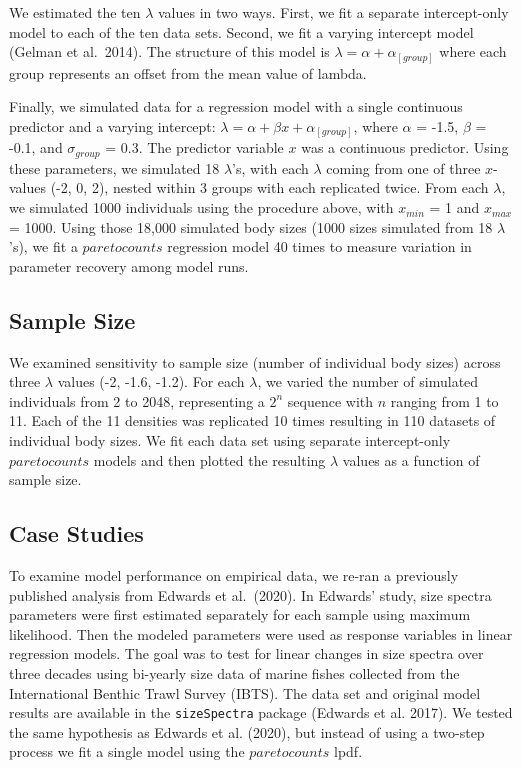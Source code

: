 \documentclass[
  12pt,
]{article}
\begin{document}
We estimated the ten \(\lambda\) values in two ways. First, we fit a
separate intercept-only model to each of the ten data sets. Second, we
fit a varying intercept model (Gelman et al.~2014). The structure of
this model is \(\lambda = \alpha + \alpha_{[group]}\) where each group
represents an offset from the mean value of lambda.

Finally, we simulated data for a regression model with a single
continuous predictor and a varying intercept:
\(\lambda = \alpha + \beta x + \alpha_{[group]}\), where \(\alpha\) =
-1.5, \(\beta\) = -0.1, and \(\sigma_{group}\) = 0.3. The predictor
variable \(x\) was a continuous predictor. Using these parameters, we
simulated 18 \(\lambda\)'s, with each \(\lambda\) coming from one of
three \(x\)-values (-2, 0, 2), nested within 3 groups with each
replicated twice. From each \(\lambda\), we simulated 1000 individuals
using the procedure above, with \(x_{min}\) = 1 and \(x_{max}\) = 1000.
Using those 18,000 simulated body sizes (1000 sizes simulated from 18
\(\lambda\)'s), we fit a \(paretocounts\) regression model 40 times to
measure variation in parameter recovery among model runs.

\hypertarget{sample-size}{%
\subsection{Sample Size}\label{sample-size}}

We examined sensitivity to sample size (number of individual body sizes)
across three \(\lambda\) values (-2, -1.6, -1.2). For each \(\lambda\),
we varied the number of simulated individuals from 2 to 2048,
representing a \(2^n\) sequence with \(n\) ranging from 1 to 11. Each of
the 11 densities was replicated 10 times resulting in 110 datasets of
individual body sizes. We fit each data set using separate
intercept-only \(paretocounts\) models and then plotted the resulting
\(\lambda\) values as a function of sample size.

\hypertarget{case-studies}{%
\subsection{Case Studies}\label{case-studies}}

To examine model performance on empirical data, we re-ran a previously
published analysis from Edwards et al.~(2020). In Edwards' study, size
spectra parameters were first estimated separately for each sample using
maximum likelihood. Then the modeled parameters were used as response
variables in linear regression models. The goal was to test for linear
changes in size spectra over three decades using bi-yearly size data of
marine fishes collected from the International Benthic Trawl Survey
(IBTS). The data set and original model results are available in the
\texttt{sizeSpectra} package (Edwards et al. 2017). We tested the same
hypothesis as Edwards et al. (2020), but instead of using a two-step
process we fit a single model using the \(paretocounts\) lpdf.
\end{document}
